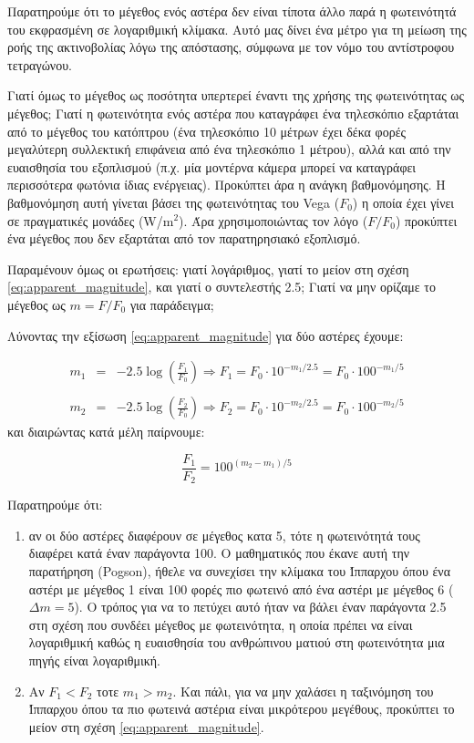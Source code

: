 Παρατηρούμε ότι το μέγεθος ενός αστέρα δεν είναι τίποτα άλλο παρά η φωτεινότητά του εκφρασμένη σε λογαριθμική κλίμακα. Αυτό μας δίνει ένα μέτρο για τη μείωση της ροής της ακτινοβολίας λόγω της απόστασης, σύμφωνα με τον νόμο του αντίστροφου τετραγώνου.

Γιατί όμως το μέγεθος ως ποσότητα υπερτερεί έναντι της χρήσης της φωτεινότητας ως μέγεθος; Γιατί η φωτεινότητα ενός αστέρα που καταγράφει ένα τηλεσκόπιο εξαρτάται από το μέγεθος του κατόπτρου (ένα τηλεσκόπιο 10 μέτρων έχει δέκα φορές μεγαλύτερη συλλεκτική επιφάνεια από ένα τηλεσκόπιο 1 μέτρου), αλλά και από την ευαισθησία του εξοπλισμού (π.χ. μία μοντέρνα κάμερα μπορεί να καταγράφει περισσότερα φωτόνια ίδιας ενέργειας). Προκύπτει άρα η ανάγκη βαθμονόμησης. Η βαθμονόμηση αυτή γίνεται βάσει της φωτεινότητας του Vega ($F_0$) η οποία έχει γίνει σε πραγματικές μονάδες (W/$\text{m}^2$). Άρα χρησιμοποιώντας τον λόγο ($F/F_0$) προκύπτει ένα μέγεθος που δεν εξαρτάται από τον παρατηρησιακό εξοπλισμό.

Παραμένουν όμως οι ερωτήσεις: γιατί λογάριθμος, γιατί το μείον στη σχέση \eqref{eq:apparent_magnitude}, και γιατί ο συντελεστής 2.5; Γιατί να μην ορίζαμε το μέγεθος ως $m = F/F_0$ για παράδειγμα;

Λύνοντας την εξίσωση \eqref{eq:apparent_magnitude} για δύο αστέρες έχουμε:

\begin{eqnarray*}
    m_1 &=& -2.5 \log \left( \frac{F_1}{F_0} \right) \Rightarrow F_1 = F_0 \cdot 10^{-m_1/2.5} = F_0 \cdot 100^{-m_1/5} \\\\
    m_2 &=& -2.5 \log \left( \frac{F_2}{F_0} \right) \Rightarrow F_2 = F_0 \cdot 10^{-m_2/2.5} = F_0 \cdot 100^{-m_2/5}
\end{eqnarray*}
και διαιρώντας κατά μέλη παίρνουμε:

\begin{equation}
    \frac{F_1}{F_2} = 100^{(m_2 - m_1)/5}
\end{equation}

Παρατηρούμε ότι:
\begin{enumerate}
    \item αν οι δύο αστέρες διαφέρουν σε μέγεθος κατα 5, τότε η φωτεινότητά τους διαφέρει κατά έναν παράγοντα 100. Ο μαθηματικός που έκανε αυτή την παρατήρηση (Pogson), ήθελε να συνεχίσει την κλίμακα του Ίππαρχου όπου ένα αστέρι με μέγεθος 1 είναι 100 φορές πιο φωτεινό από ένα αστέρι με μέγεθος 6 ($\Delta m = 5$). Ο τρόπος για να το πετύχει αυτό ήταν να βάλει έναν παράγοντα 2.5 στη σχέση που συνδέει μέγεθος με φωτεινότητα, η οποία πρέπει να είναι λογαριθμική καθώς η ευαισθησία του ανθρώπινου ματιού στη φωτεινότητα μια πηγής είναι λογαριθμική.
    \item Αν $F_1 < F_2$ τοτε $m_1 > m_2$. Και πάλι, για να μην χαλάσει η ταξινόμηση του Ίππαρχου όπου τα πιο φωτεινά αστέρια είναι μικρότερου μεγέθους, προκύπτει το μείον στη σχέση \eqref{eq:apparent_magnitude}.
\end{enumerate}

